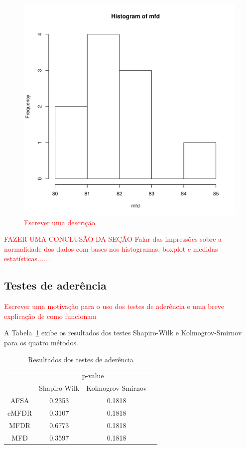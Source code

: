 \documentclass[conference]{IEEEtran}
\begin{document}
\begin{figure}[h]
	\centering
	\includegraphics[width=\linewidth]{img/hist_mfd.pdf}
	\caption{\textcolor{red}{Escrever uma descrição}.}
	\label{fig:hist_mfd}
\end{figure}




\textcolor{red}{FAZER UMA CONCLUSÃO DA SEÇÃO
Falar das impressões sobre a normalidade dos dados com bases nos histogramas, boxplot e medidas estatísticas.......}

\subsection{Testes de aderência}

\textcolor{red}{Escrever uma motivação para o uso dos testes de aderência e uma breve explicação de como funcionam}

A Tabela~\ref{tab:aderencia} exibe os resultados dos testes Shapiro-Wilk e Kolmogrov-Smirnov para os quatro métodos.

\begin{table}[]
	\centering
	\caption{Resultados dos testes de aderência}
	\label{tab:aderencia}
	\begin{tabular}{c|ccc}
		\hline
		& \multicolumn{2}{c}{p-value}      \\
		\cline{2-3}
		& Shapiro-Wilk & Kolmogrov-Smirnov \\
		\hline
		AFSA  & 0.2353       & 0.1818            \\
		cMFDR & 0.3107       & 0.1818            \\
		MFDR  & 0.6773       & 0.1818            \\
		MFD   & 0.3597       &  0.1818               \\
		\hline
	\end{tabular}
\end{table}
\end{document}
